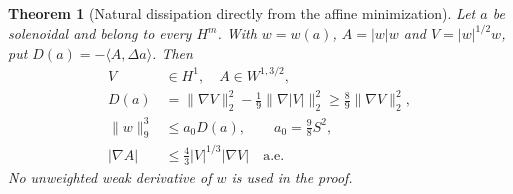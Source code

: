 \documentclass[11pt,a4paper]{article}
\newtheorem{theorem}{Theorem}[section]
\theoremstyle{definition}\newtheorem{definition}[theorem]{Definition}
\theoremstyle{remark}\newtheorem{remark}[theorem]{Remark}
\newcommand{\norm}[1]{\lVert #1\rVert}
\newcommand{\ip}[2]{\langle #1,#2\rangle}
\numberwithin{equation}{section}
\begin{document}
\begin{theorem}[Natural dissipation directly from the affine minimization]\label{thm:natural}
Let $a$ be solenoidal and belong to every $H^m$. With $w=w(a)$, $A=|w|w$ and $V=|w|^{1/2}w$, put $D(a)=-\ip A{\Delta a}$. Then
\begin{align}
 V&\in H^1,\quad A\in W^{1,3/2},\label{eq:Vreg}\\
 D(a)&=\norm{\nabla V}_2^2-\tfrac19\norm{\nabla|V|}_2^2
 \ge\tfrac89\norm{\nabla V}_2^2,\label{eq:Dnatural}\\
 \norm w_9^3&\le a_0D(a),\qquad a_0=\tfrac98 S^2,\label{eq:w9}\\
 |\nabla A|&\le\tfrac43|V|^{1/3}|\nabla V|\quad\text{a.e.}\label{eq:gradA}
\end{align}
No unweighted weak derivative of $w$ is used in the proof.
\end{theorem}
\end{document}
